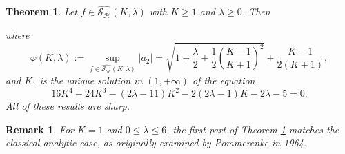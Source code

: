 \documentclass[11pt, reqno]{amsart}
\newtheorem{theorem}{Theorem}
\newtheorem{rem}{Remark}
\numberwithin{equation}{section}
\newcommand{\abs}[1]{\left\vert#1\right\vert}
\begin{document}
\begin{theorem}\label{t1}
Let $f\in\widehat{\mathcal{S}_\mathcal{H}}(K,\lambda)$ with $K\geq1$ and $\lambda\geq0$. %
Then
where
\begin{equation}\label{1}\varphi(K,\lambda):=\sup\limits_{f\in\widehat{\mathcal{S}_\mathcal{H}}(K,\lambda)}\abs{a_2}
=\sqrt{1+\frac{\lambda}{2}+\frac{1}{2}\left(\frac{K-1}{K+1}\right)^2}+\frac{K-1}{2\left({K+1}\right)},\end{equation}
and 
$K_1$ is the unique solution in $(1,+\infty)$ of the equation
\begin{equation}\label{2}16K^4+24K^3-(2\lambda-11)K^2-2(2\lambda-1)K-2\lambda-5=0.\end{equation}
All of these results are sharp.
\end{theorem}


\begin{rem}
{\rm For $K=1$ and $0\leq\lambda\leq6$, 
 the first part of Theorem \ref{t1} matches the classical analytic case, as originally examined by Pommerenke \cite{p} in 1964.
}
\end{rem}

\end{document}
